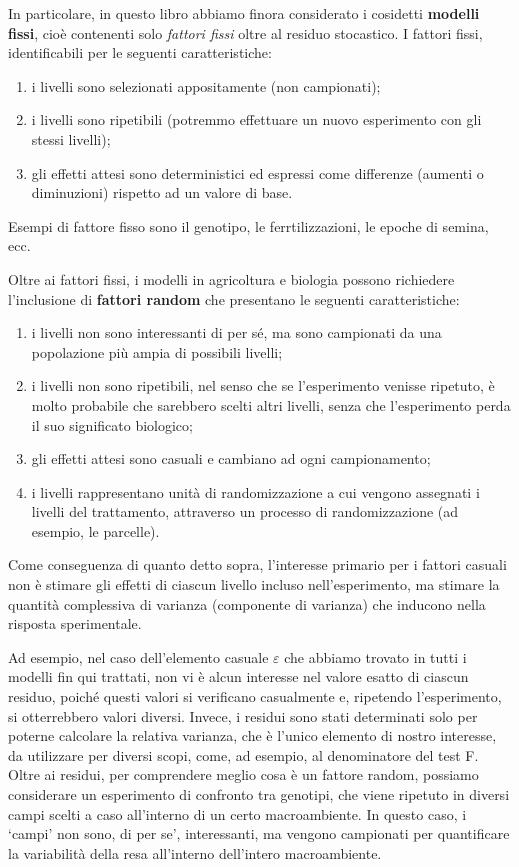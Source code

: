 \documentclass[
  12pt,
]{book}
\providecommand{\tightlist}{%
  \setlength{\itemsep}{0pt}\setlength{\parskip}{0pt}}
\begin{document}
In particolare, in questo libro abbiamo finora considerato i cosidetti \textbf{modelli fissi}, cioè contenenti solo \emph{fattori fissi} oltre al residuo stocastico. I fattori fissi, identificabili per le seguenti caratteristiche:

\begin{enumerate}
\def\labelenumi{\arabic{enumi}.}
\tightlist
\item
  i livelli sono selezionati appositamente (non campionati);
\item
  i livelli sono ripetibili (potremmo effettuare un nuovo esperimento con gli stessi livelli);
\item
  gli effetti attesi sono deterministici ed espressi come differenze (aumenti o diminuzioni) rispetto ad un valore di base.
\end{enumerate}

Esempi di fattore fisso sono il genotipo, le ferrtilizzazioni, le epoche di semina, ecc.

Oltre ai fattori fissi, i modelli in agricoltura e biologia possono richiedere l'inclusione di \textbf{fattori random} che presentano le seguenti caratteristiche:

\begin{enumerate}
\def\labelenumi{\arabic{enumi}.}
\tightlist
\item
  i livelli non sono interessanti di per sé, ma sono campionati da una popolazione più ampia di possibili livelli;
\item
  i livelli non sono ripetibili, nel senso che se l'esperimento venisse ripetuto, è molto probabile che sarebbero scelti altri livelli, senza che l'esperimento perda il suo significato biologico;
\item
  gli effetti attesi sono casuali e cambiano ad ogni campionamento;
\item
  i livelli rappresentano unità di randomizzazione a cui vengono assegnati i livelli del trattamento, attraverso un processo di randomizzazione (ad esempio, le parcelle).
\end{enumerate}

Come conseguenza di quanto detto sopra, l'interesse primario per i fattori casuali non è stimare gli effetti di ciascun livello incluso nell'esperimento, ma stimare la quantità complessiva di varianza (componente di varianza) che inducono nella risposta sperimentale.

Ad esempio, nel caso dell'elemento casuale \(\varepsilon\) che abbiamo trovato in tutti i modelli fin qui trattati, non vi è alcun interesse nel valore esatto di ciascun residuo, poiché questi valori si verificano casualmente e, ripetendo l'esperimento, si otterrebbero valori diversi. Invece, i residui sono stati determinati solo per poterne calcolare la relativa varianza, che è l'unico elemento di nostro interesse, da utilizzare per diversi scopi, come, ad esempio, al denominatore del test F. Oltre ai residui, per comprendere meglio cosa è un fattore random, possiamo considerare un esperimento di confronto tra genotipi, che viene ripetuto in diversi campi scelti a caso all'interno di un certo macroambiente. In questo caso, i `campi' non sono, di per se', interessanti, ma vengono campionati per quantificare la variabilità della resa all'interno dell'intero macroambiente.
\end{document}
